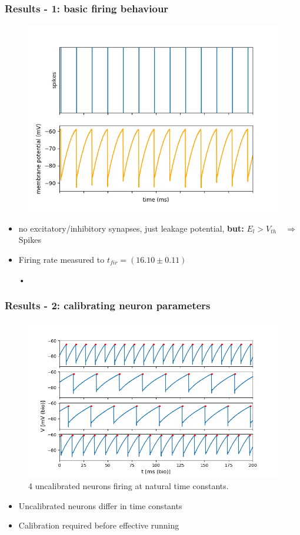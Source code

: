 \documentclass{beamer}
\begin{document}
\begin{frame}
    \frametitle{Results - 1: basic firing behaviour}
    \begin{figure}
    		\centering
    		\includegraphics[width=0.6\linewidth]{figures/fp_task1_1membrane.png}
    \end{figure}

    \begin{itemize}
    		\item no excitatory/inhibitory synapses,  just leakage potential,
    		\textbf{but: } $E_l>V_{th}\quad \Rightarrow$ Spikes
    		\item Firing rate measured to $t_{fir} = (16.10\pm 0.11)$\begin{center}
    		•
    		\end{center}
    \end{itemize}
\end{frame}

\begin{frame}
    \frametitle{Results - 2: calibrating neuron parameters}
    \begin{figure}
        \includegraphics[width=.7\textwidth]{figures/4membranes.png}
        \caption{4 uncalibrated neurons firing at natural time constants.}
    \end{figure}
    \begin{itemize}
        \item Uncalibrated neurons differ in time constants
        \item Calibration required before effective running
    \end{itemize}
\end{frame}
\end{document}
